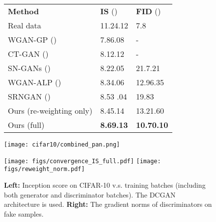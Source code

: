 \documentclass{article}
\newcommand{\0}{\bm{0}}
\begin{document}
\begin{figure}[t]
\begin{minipage}{0.47\textwidth}
\vspace{-0.8em}
\setlength{\tabcolsep}{2.2pt}  
\renewcommand{\arraystretch}{0.85} 
\footnotesize
  \centering
  \begin{tabular}{@{}lll@{}}
    \toprule
    {\bf Method}     & {\bf IS} () & {\bf FID} () \\
    \cmidrule{1-3}
    Real data & 11.24.12 & 7.8\\
\cmidrule{1-3}
WGAN-GP (\citeyear{wgangp}) & 7.86.08 & - \\
    CT-GAN (\citeyear{wwgan}) &  8.12.12 & - \\
    SN-GANs (\citeyear{SNGAN}) & 8.22.05 & 21.7.21 \\
    WGAN-ALP (\citeyear{wganalp}) & 8.34.06 & 12.96.35\\
    SRNGAN (\citeyear{srngan}) & 8.53 .04 & 19.83\\
Ours {(re-weighting only)} & 8.45.14 & 13.21.60 \\
    Ours (full) & \textbf{8.69.13} &\textbf{10.70.10}\\
    \bottomrule
  \end{tabular}
  \vspace{-5pt}
   \label{tab:exp:image:IS_FID}
\vskip -0.4in
\end{minipage}
\hfill
\begin{minipage}{0.51\textwidth}
\begin{center}
\centerline{
\texttt{[image: cifar10/combined\_pan.png]}
}
\vskip -0.1in
\label{cifar10_combined}
\end{center}
\end{minipage}
\vspace{-15pt}
\end{figure}

\begin{figure}[t]
\begin{center}
\texttt{[image: figs/convergence\_IS\_full.pdf]}
\hspace{7pt}
\texttt{[image: figs/reweight\_norm.pdf]}
\vspace{-2pt}
\caption{{\bf Left:}  Inception score on CIFAR-10 v.s. training batches (including both generator and discriminator batches). The DCGAN~\cite{DCGAN} architecture is used. {\bf Right:} The gradient norms of discriminators on fake samples. 
}
\label{fig:image:converge}
\end{center}
\vspace{-5pt}
\end{figure}
\end{document}
